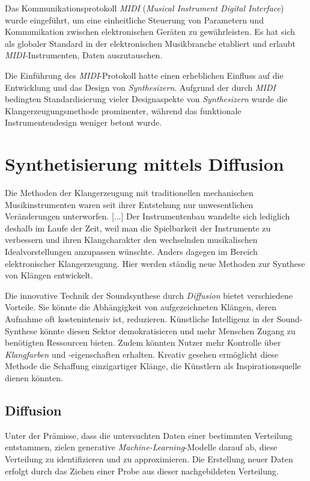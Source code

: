 \documentclass[
  a4paper,  %
  twoside,  %
  bibliography=totoc,
  headsepline,
  cleardoublepage=empty,
  parskip=half,
  draft=false
]{scrbook}
\begin{document}
Das Kommunikationsprotokoll \emph{MIDI} (\emph{Musical Instrument Digital Interface}) \cite{midi_association_midi_nodate} wurde eingeführt, um eine einheitliche Steuerung von Parametern und Kommunikation zwischen elektronischen Geräten zu gewährleisten. Es hat sich als globaler Standard in der elektronischen Musikbranche etabliert und erlaubt \emph{MIDI}-Instrumenten, Daten auszutauschen. \cite{ruschkowski_elektronische_2019}

Die Einführung des \emph{MIDI}-Protokoll hatte einen erheblichen Einfluss auf die Entwicklung und das Design von \emph{Synthesizern}. Aufgrund der durch \emph{MIDI} bedingten Standardisierung vieler Designaspekte von \emph{Synthesizern} wurde die Klangerzeugungsmethode prominenter, während das funktionale Instrumentendesign weniger betont wurde. \cite{russ_sound_2009}

\section{Synthetisierung mittels Diffusion}

\glqq Die Methoden der Klangerzeugung mit traditionellen mechanischen Musikinstrumenten waren seit ihrer Entstehung nur unwesentlichen Veränderungen unterworfen. [...] Der Instrumentenbau wandelte sich lediglich deshalb im Laufe der Zeit, weil man die Spielbarkeit der Instrumente zu verbessern und ihren Klangcharakter den wechselnden musikalischen Idealvorstellungen anzupassen wünschte. Anders dagegen im Bereich elektronischer Klangerzeugung. Hier werden ständig neue Methoden zur Synthese von Klängen entwickelt.\grqq \, \cite{ruschkowski_elektronische_2019}

Die innovative Technik der Soundsynthese durch \emph{Diffusion} bietet verschiedene Vorteile. Sie könnte die Abhängigkeit von aufgezeichneten Klängen, deren Aufnahme oft kostenintensiv ist, reduzieren. Künstliche Intelligenz in der Sound-Synthese könnte diesen Sektor demokratisieren und mehr Menschen Zugang zu benötigten Ressourcen bieten. Zudem könnten Nutzer mehr Kontrolle über \emph{Klangfarben} und -eigenschaften erhalten. Kreativ gesehen ermöglicht diese Methode die Schaffung einzigartiger Klänge, die Künstlern als Inspirationsquelle dienen könnten. \cite{haohe_liu_audioldm_2023}


\subsection{Diffusion}
Unter der Prämisse, dass die untersuchten Daten einer bestimmten Verteilung entstammen, zielen generative \emph{Machine-Learning}-Modelle darauf ab, diese Verteilung zu identifizieren und zu approximieren. Die Erstellung neuer Daten erfolgt durch das Ziehen einer Probe aus dieser nachgebildeten Verteilung. \cite{machine_learning_at_berkeley_diffusion_2022}
\end{document}
